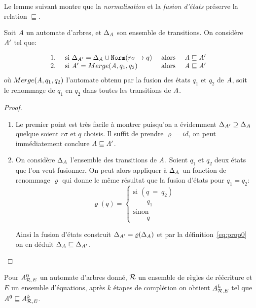 Le lemme suivant montre que la \emph{normalisation} et la \emph{fusion
  d'états} préserve la relation $\sqsubseteq$.

\begin{lemma}
  Soit $\mathit A$ un automate d'arbres, et $\Delta_\mathit A$ son ensemble de transitions. 
  On considère $\mathit A'$ tel que:
  
  \[
  \begin{array}{llll}
    1. & \mbox{ si } \Delta_{\mathit A'} = \Delta_\mathit A \cup \mathtt{Norm}(r\sigma \rightarrow q) & \mbox{ alors } &\mathit A \sqsubseteq \mathit A' \\
    2. & \mbox{ si } \mathit A' = Merge(\mathit A, q_1, q_2) &\mbox{ alors }& \mathit A \sqsubseteq \mathit A'  \\
  \end{array}
  \]
  où $Merge(\mathit A,q_1,q_2)$ l'automate obtenu par la fusion des états $q_1$ et $q_2$ de $\mathit A$, soit le renommage de  $q_1$
  en $q_2$ dans toutes les transitions de $\mathit A$.
\end{lemma}

\begin{proof}

  \begin{enumerate}
  \item Le premier point est très facile à montrer puisqu'on a évidemment $\Delta_{\mathit A'} \supseteq
    \Delta_\mathit A$ quelque soient $r\sigma$ et $q$ choisis.
    Il suffit de prendre $\varrho = id$, on peut immédiatement conclure $\mathit A
    \sqsubseteq \mathit A'$.

  \item On considère $\Delta_\mathit A$ l'ensemble des transitions de $\mathit A$. Soient $q_1$ et $q_2$ deux états
    que l'on veut fusionner.  On peut alors appliquer à $\Delta_\mathit A$ un fonction de renommage $\varrho$ qui donne le même 
    résultat que la fusion d'états pour $q_1 = q_2$:
    \[
    \varrho(q) = \left\{
      \begin{array}{l}
        \textrm{si }(q\ =\ q_2)\\
        \quad \quad q_1\\
        \textrm{sinon}\\
        \quad \quad q
      \end{array}\right.
    \]
    
    Ainsi la fusion d'états construit $\Delta_{\mathit A'} = \varrho(\Delta_\mathit A)$ et par 
    la définition~\ref{eq:prop0} on en déduit $\Delta_A \sqsubseteq \Delta_{\mathit A'}$.
  \end{enumerate}
\end{proof}


\begin{theorem}
  Pour ${\mathit A}_{\mathcal R,E}^0$ un automate d'arbres donné, $\mathcal R$ un ensemble de règles de réécriture
  et $E$ un ensemble d'équations, après $k$ étapes de complétion on obtient 
  ${\mathit A}_{\mathcal R,E}^k$ tel que  $\mathit A^0 \sqsubseteq {\mathit A}_{\mathcal R,E}^k$.
\end{theorem}

